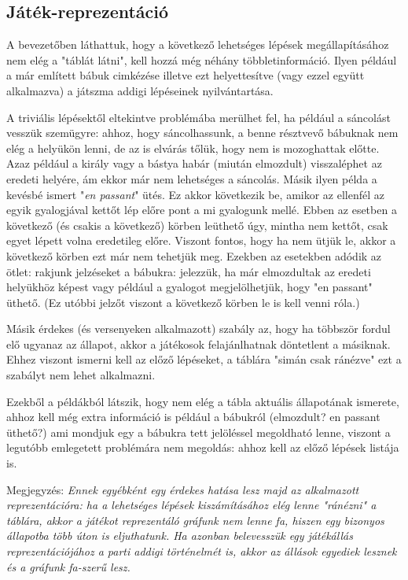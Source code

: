 \documentclass[twoside, a4paper, 12pt]{article}
\begin{document}
\newpage
\subsection{Játék-reprezentáció}
A bevezetőben láthattuk, hogy a következő lehetséges lépések megállapításához nem elég a "táblát látni", kell hozzá még néhány többletinformáció. Ilyen például a már említett bábuk cimkézése illetve ezt helyettesítve (vagy ezzel együtt alkalmazva) a játszma addigi lépéseinek nyilvántartása.

A triviális lépésektől eltekintve problémába merülhet fel, ha például a sáncolást vesszük szemügyre: ahhoz, hogy sáncolhassunk, a benne résztvevő bábuknak nem elég a helyükön lenni, de az is elvárás tőlük, hogy nem is mozoghattak előtte. Azaz például a király vagy a bástya habár (miután elmozdult) visszaléphet az eredeti helyére, ám ekkor már nem lehetséges a sáncolás. Másik ilyen példa a kevésbé ismert "\textit{en passant}" ütés. Ez akkor következik be, amikor az ellenfél az egyik gyalogjával kettőt lép előre pont a mi gyalogunk mellé. Ebben az esetben a következő (és csakis a következő) körben leüthető úgy, mintha nem kettőt, csak egyet lépett volna eredetileg előre. Viszont fontos, hogy ha nem ütjük le, akkor a következő körben ezt már nem tehetjük meg. Ezekben az esetekben adódik az ötlet: rakjunk jelzéseket a bábukra: jelezzük, ha már elmozdultak az eredeti helyükhöz képest vagy például a gyalogot megjelölhetjük, hogy "en passant" üthető. (Ez utóbbi jelzőt viszont a következő körben le is kell venni róla.)

Másik érdekes (és versenyeken alkalmazott) szabály az, hogy ha többször fordul elő ugyanaz az állapot, akkor a játékosok felajánlhatnak döntetlent a másiknak. Ehhez viszont ismerni kell az előző lépéseket, a táblára "simán csak ránézve" ezt a szabályt nem lehet alkalmazni.

Ezekből a példákból látszik, hogy nem elég a tábla aktuális állapotának ismerete, ahhoz kell még extra információ is például a bábukról (elmozdult? en passant üthető?) ami mondjuk egy a bábukra tett jelöléssel megoldható lenne, viszont a legutóbb emlegetett problémára nem megoldás: ahhoz kell az előző lépések listája is.

Megjegyzés: \textit{Ennek egyébként egy érdekes hatása lesz majd az alkalmazott reprezentációra: ha a lehetséges lépések kiszámításához elég lenne "ránézni" a táblára, akkor a játékot reprezentáló gráfunk nem lenne fa, hiszen egy bizonyos állapotba több úton is eljuthatunk. Ha azonban belevesszük egy játékállás reprezentációjához a parti addigi történelmét is, akkor az állások egyediek lesznek és a gráfunk fa-szerű lesz.}
\end{document}

